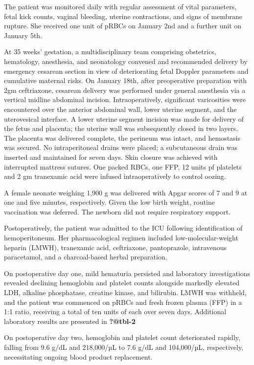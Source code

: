 \documentclass[
  letterpaper,
  DIV=11,
  numbers=noendperiod]{scrartcl}
\begin{document}
The patient was monitored daily with regular assessment of vital
parameters, fetal kick counts, vaginal bleeding, uterine contractions,
and signs of membrane rupture. She received one unit of pRBCs on January
2nd and a further unit on January 5th.

At 35 weeks' gestation, a multidisciplinary team comprising obstetrics,
hematology, anesthesia, and neonatology convened and recommended
delivery by emergency cesarean section in view of deteriorating fetal
Doppler parameters and cumulative maternal risks. On January 18th, after
preoperative preparation with 2gm ceftriaxone, cesarean delivery was
performed under general anesthesia via a vertical midline abdominal
incision. Intraoperatively, significant varicosities were encountered
over the anterior abdominal wall, lower uterine segment, and the
uterovesical interface. A lower uterine segment incision was made for
delivery of the fetus and placenta; the uterine wall was subsequently
closed in two layers. The placenta was delivered complete, the perineum
was intact, and hemostasis was secured. No intraperitoneal drains were
placed; a subcutaneous drain was inserted and maintained for seven days.
Skin closure was achieved with interrupted mattress sutures. One packed
RBCs, one FFP, 12 units pf platelets and 2 gm tranexamic acid were
infused intraoperatively to control oozing.

A female neonate weighing 1,900 g was delivered with Apgar scores of 7
and 9 at one and five minutes, respectively. Given the low birth weight,
routine vaccination was deferred. The newborn did not require
respiratory support.

Postoperatively, the patient was admitted to the ICU following
identification of hemoperitoneum. Her pharmacological regimen included
low-molecular-weight heparin (LMWH), tranexamic acid, ceftriaxone,
pantoprazole, intravenous paracetamol, and a charcoal-based herbal
preparation.

On postoperative day one, mild hematuria persisted and laboratory
investigations revealed declining hemoglobin and platelet counts
alongside markedly elevated LDH, alkaline phosphatase, creatine kinase,
and bilirubin. LMWH was withheld, and the patient was commenced on pRBCs
and fresh frozen plasma (FFP) in a 1:1 ratio, receiving a total of ten
units of each over seven days. Additional laboratory results are
presented in \textbf{?@tbl-2}

On postoperative day two, hemoglobin and platelet count deteriorated
rapidly, falling from 9.6 g/dL and 218,000/µL to 7.6 g/dL and
104,000/µL, respectively, necessitating ongoing blood product
replacement.
\end{document}
